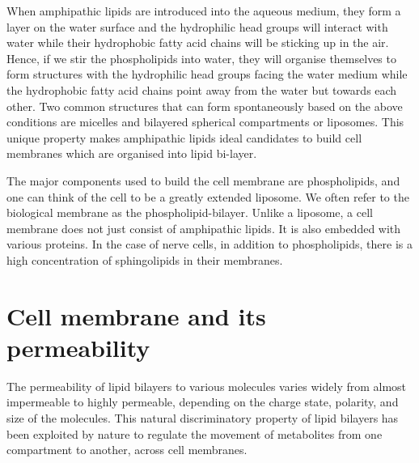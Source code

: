 \documentclass[11pt]{article}
\begin{document}
When amphipathic lipids are introduced into the aqueous medium, they form a layer on the water surface and the hydrophilic head groups will interact with water while their hydrophobic fatty acid chains will be sticking up in the air. Hence, if we stir the phospholipids into water, they will organise themselves to form structures with the hydrophilic head groups facing the water medium while the hydrophobic fatty acid chains point away from the water but towards each other. Two common structures that can form spontaneously based on the above conditions are micelles and bilayered spherical compartments or liposomes. This unique property makes amphipathic lipids ideal candidates to build cell membranes which are organised into lipid bi-layer.


The major components used to build the cell membrane are phospholipids, and one can think of the cell to be a greatly extended liposome. We often refer to the biological membrane as the phospholipid-bilayer. Unlike a liposome, a cell membrane does not just consist of amphipathic lipids. It is also embedded with various proteins. In the case of nerve cells, in addition to phospholipids, there is a high concentration of sphingolipids in their membranes.
\section{Cell membrane and its permeability}
\label{sec:orgd29d27a}
The permeability of lipid bilayers to various molecules varies widely from almost impermeable to highly permeable, depending on the charge state, polarity, and size of the molecules. This natural discriminatory property of lipid bilayers has been exploited by nature to regulate the movement of metabolites from one compartment to another, across cell membranes.
\end{document}

